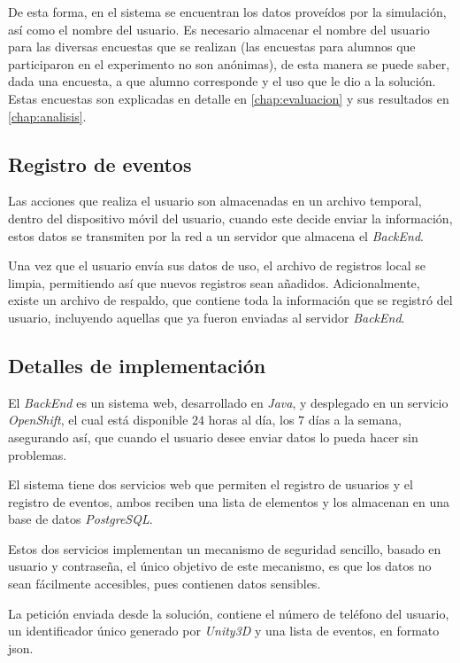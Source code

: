 De esta forma, en el sistema se encuentran los datos proveídos por la
simulación, así como el nombre del usuario. Es necesario almacenar el nombre del
usuario para las diversas encuestas que se realizan (las encuestas para alumnos
que participaron en el experimento no son anónimas), de esta manera se puede
saber, dada una encuesta, a que alumno corresponde y el uso que le dio a la
solución. Estas encuestas son explicadas en detalle en \ref{chap:evaluacion} y sus 
resultados en \ref{chap:analisis}.

\subsection{Registro de eventos}

Las acciones que realiza el usuario son almacenadas en un archivo temporal,
dentro del dispositivo móvil del usuario, cuando este decide enviar la
información, estos datos se transmiten por la red a un servidor que almacena el
\textit{BackEnd}.

Una vez que el usuario envía sus datos de uso, el archivo de registros
local se limpia, permitiendo así que nuevos registros sean añadidos.
Adicionalmente, existe un archivo de respaldo, que contiene toda la información
que se registró del usuario, incluyendo aquellas que ya fueron enviadas al
servidor \textit{BackEnd}.

\subsection{Detalles de implementación}

El \textit{BackEnd} es un sistema web, desarrollado en \textit{Java}, y
desplegado en un servicio \textit{OpenShift}, el cual está disponible $24$ horas
al día, los $7$ días a la semana, asegurando así, que cuando el usuario desee
enviar datos lo pueda hacer sin problemas.

El sistema tiene dos servicios web que permiten el registro de usuarios y el
registro de eventos, ambos reciben una lista de elementos y los almacenan en una
base de datos \textit{PostgreSQL}.

Estos dos servicios implementan un mecanismo de seguridad sencillo, basado en usuario y
contraseña, el único objetivo de este mecanismo, es que los datos no sean
fácilmente accesibles, pues contienen datos sensibles.

La petición enviada desde la solución, contiene el número de teléfono del
usuario, un identificador único generado por \textit{Unity3D} y una lista de
eventos, en formato \Gls{json}.

